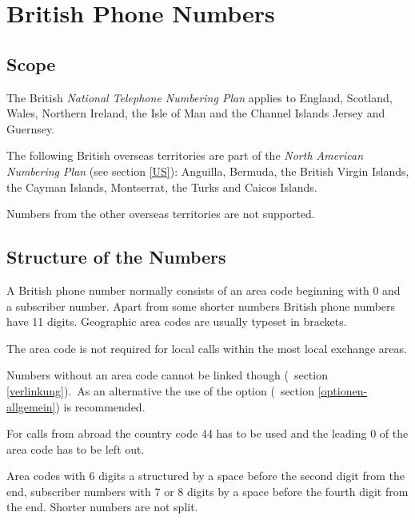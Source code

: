 \documentclass[numbers=noenddot]{scrreprt}
\newcommand\UeberschriftGeltungsbereich{\section{Scope}}
\newcommand\UeberschriftAufbau{\section{Structure of the Numbers}}
\newcommand\KeineVerlinkung{Numbers without an area code cannot be linked though
\vglAbschnitt{verlinkung}.}
\newcommand*\vglAbschnitt[1]{(\cf\ section \ref{#1})}
\newcommand*\sieheAbschnitt[1]{(see section \ref{#1})}
\newcommand*\AufbauDEATD[1]{For calls from abroad the country code #1 has to be used and the leading 0 of the area code has to be left out.}
\begin{document}
\chapter{British Phone Numbers}
\nocite{wikipedia-UK}
\nocite{wikipedia-conventions}
\nocite{UK-formatting}
\edef\myindent{\the\parindent}
\begin{minipage}{12cm}\setlength{\parindent}{\myindent}
\UeberschriftGeltungsbereich
The British \emph{National Telephone Numbering Plan}
\cite{Ofcom-plan}
applies to England, Scotland, Wales, Northern Ireland, the Isle of Man and the Channel Islands Jersey and Guernsey.

The following British overseas territories are part of the \emph{North American Numbering Plan}
\sieheAbschnitt{US}: Anguilla, Bermuda, the British Virgin Islands, the Cayman Islands, Montserrat, the Turks and Caicos Islands.

Numbers from the other overseas territories are not supported.
\end{minipage}
\hfill
{}

\UeberschriftAufbau
A British phone number normally consists of an area code beginning with 0 and a subscriber number. Apart from some shorter numbers British phone numbers have 11 digits. Geographic area codes are usually typeset in brackets.
\begin{sidebyside}
\end{sidebyside}

The area code is not required for local calls within the most local exchange areas.
\begin{sidebyside}
\end{sidebyside}
\KeineVerlinkung\ As an alternative the use of the  option
\vglAbschnitt{optionen-allgemein} is recommended.

\AufbauDEATD{44}
\begin{sidebyside}
\end{sidebyside}

Area codes with 6 digits a structured by a space before the second digit from the end, subscriber numbers with 7 or 8 digits by a space before the fourth digit from the end. Shorter numbers are not split.
\begin{sidebyside}
   \\
   \\
\end{sidebyside}
\end{document}
